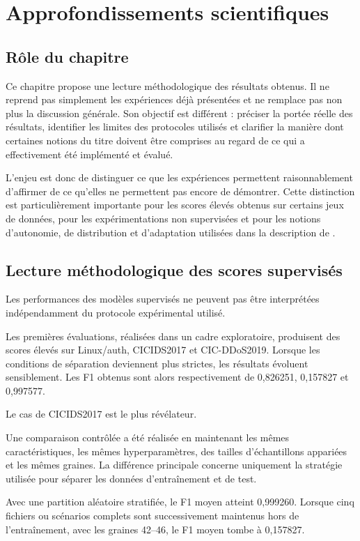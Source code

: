 \chapter{Approfondissements scientifiques}

\section{Rôle du chapitre}

Ce chapitre propose une lecture méthodologique des résultats obtenus. Il ne reprend pas simplement les expériences déjà présentées et ne remplace pas non plus la discussion générale. Son objectif est différent : préciser la portée réelle des résultats, identifier les limites des protocoles utilisés et clarifier la manière dont certaines notions du titre doivent être comprises au regard de ce qui a effectivement été implémenté et évalué.

L'enjeu est donc de distinguer ce que les expériences permettent raisonnablement d'affirmer de ce qu'elles ne permettent pas encore de démontrer. Cette distinction est particulièrement importante pour les scores élevés obtenus sur certains jeux de données, pour les expérimentations non supervisées et pour les notions d'autonomie, de distribution et d'adaptation utilisées dans la description de \logminer{}.

\section{Lecture méthodologique des scores supervisés}

Les performances des modèles supervisés ne peuvent pas être interprétées indépendamment du protocole expérimental utilisé.

Les premières évaluations, réalisées dans un cadre exploratoire, produisent des scores élevés sur Linux/auth, CICIDS2017 et CIC-DDoS2019. Lorsque les conditions de séparation deviennent plus strictes, les résultats évoluent sensiblement. Les F1 obtenus sont alors respectivement de 0,826251, 0,157827 et 0,997577.

Le cas de CICIDS2017 est le plus révélateur.

Une comparaison contrôlée a été réalisée en maintenant les mêmes caractéristiques, les mêmes hyperparamètres, des tailles d'échantillons appariées et les mêmes graines. La différence principale concerne uniquement la stratégie utilisée pour séparer les données d'entraînement et de test.

Avec une partition aléatoire stratifiée, le F1 moyen atteint 0,999260. Lorsque cinq fichiers ou scénarios complets sont successivement maintenus hors de l'entraînement, avec les graines 42--46, le F1 moyen tombe à 0,157827.

